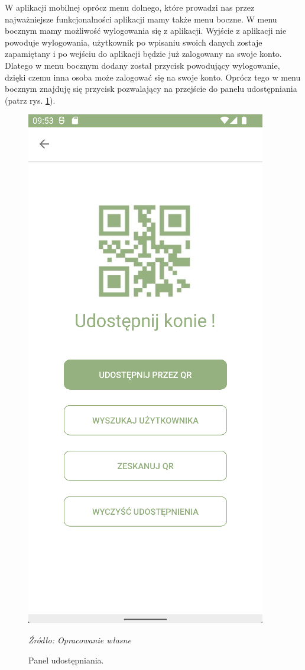 \documentclass[12pt,oneside]{report}
\begin{document}
W aplikacji mobilnej oprócz menu dolnego, które prowadzi nas przez najważniejsze funkcjonalności aplikacji mamy także menu boczne. W menu bocznym mamy możliwość wylogowania się z aplikacji. Wyjście z aplikacji nie powoduje wylogowania, użytkownik po wpisaniu swoich danych zostaje zapamiętany i po wejściu do aplikacji będzie już zalogowany na swoje konto. Dlatego w menu bocznym dodany został przycisk powodujący wylogowanie, dzięki czemu inna osoba może zalogować się na swoje konto. Oprócz tego w menu bocznym znajduję się przycisk pozwalający na przejście do panelu udostępniania (patrz rys. \ref{Share}).
\begin{figure}[H]
	\centering
	\includegraphics[scale=0.7]{ShareView}
	\caption{\centering Panel udostępniania.}
	\textit{Źródło: Opracowanie własne}
	\label{Share}
\end{figure}
\end{document}
